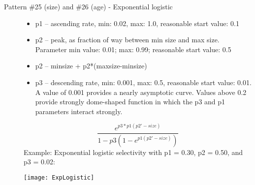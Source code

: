 \begin{description}
	\item[Pattern \#25 (size) and \#26 (age) - Exponential logistic]\hfil
	\begin{itemize}
		\item p1 – ascending rate, min: 0.02, max: 1.0, reasonable start value:  0.1
		\item p2 – peak, as fraction of way between min size and max size.  Parameter min value:  0.01; max:  0.99; reasonable start value:  0.5
		\item p2 – minsize + p2*(maxsize-minsize)
		\item p3 – descending rate, min: 0.001, max: 0.5, reasonable start value:  0.01.  A value of 0.001 provides a nearly asymptotic curve.  Values above 0.2 provide strongly dome-shaped function in which the p3 and p1 parameters interact strongly.
	\end{itemize}
	\begin{equation}
	\frac{e^{p3*p1(p2'-size)}}{1-p3(1-e^{p1(p2'-size)})}
	\end{equation}
	Example: Exponential logistic selectivity with p1 = 0.30, p2 = 0.50, and p3 = 0.02:\\
	\begin{center}
		\texttt{[image: ExpLogistic]}
	\end{center}
\end{description}

